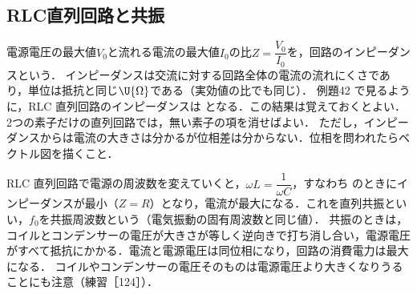 \subsection{RLC直列回路と共振}

電源電圧の最大値$V_0$と流れる電流の最大値$I_0$の比$Z=\dfrac{V_0}{I_0}$を，回路の{\gtfamily インピーダンス}という．
インピーダンスは交流に対する回路全体の電流の流れにくさであり，単位は抵抗と同じ$\U{\Omega}$である（実効値の比でも同じ）．
例題42 で見るように，RLC 直列回路のインピーダンスは
となる．この結果は覚えておくとよい．2つの素子だけの直列回路では，無い素子の項を消せばよい．
ただし，インピーダンスからは電流の大きさは分かるが位相差は分からない．位相を問われたらベクトル図を描くこと．

RLC 直列回路で電源の周波数を変えていくと，$\omega L=\dfrac{1}{\omega C}$，すなわち
のときにインピーダンスが最小（$Z=R$）となり，電流が最大になる．これを{\gtfamily 直列共振}といい，$f_0$を{\gtfamily 共振周波数}という（電気振動の固有周波数と同じ値）．
共振のときは，コイルとコンデンサーの電圧が大きさが等しく逆向きで打ち消し合い，{\gtfamily 電源電圧がすべて抵抗にかかる}．電流と電源電圧は同位相になり，回路の消費電力は最大になる．
コイルやコンデンサーの電圧そのものは電源電圧より大きくなりうることにも注意（練習［124］）．

